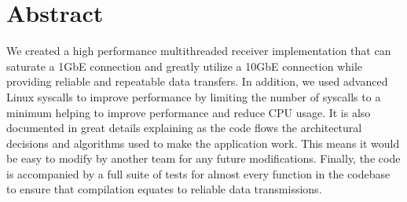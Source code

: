 \documentclass[tikz]{article}
\begin{document}

\newpage

\section{Abstract}

We created a high performance multithreaded receiver implementation that can saturate a 1GbE connection and greatly utilize a 10GbE connection while providing reliable and repeatable data transfers. In addition, we used advanced Linux syscalls to improve performance by limiting the number of syscalls to a minimum helping to improve performance and reduce CPU usage. It is also documented in great details explaining as the code flows the architectural decisions and algorithms used to make the application work. This means it would be easy to modify by another team for any future modifications. Finally, the code is accompanied by a full suite of tests for almost every function in the codebase to ensure that compilation equates to reliable data transmissions.

\newpage

\tableofcontents
\newpage


\newpage
\end{document}

